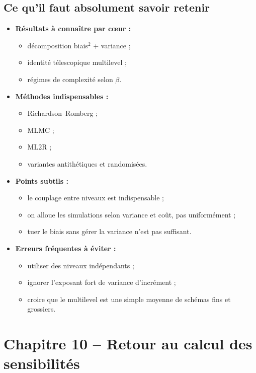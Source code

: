 \documentclass[11pt,a4paper]{article}
\begin{document}
\subsection{Ce qu'il faut absolument savoir retenir}

\begin{itemize}
  \item \textbf{Résultats à connaître par cœur :}
  \begin{itemize}
    \item décomposition biais$^2$ + variance ;
    \item identité télescopique multilevel ;
    \item régimes de complexité selon $\beta$.
  \end{itemize}
  \item \textbf{Méthodes indispensables :}
  \begin{itemize}
    \item Richardson--Romberg ;
    \item MLMC ;
    \item ML2R ;
    \item variantes antithétiques et randomisées.
  \end{itemize}
  \item \textbf{Points subtils :}
  \begin{itemize}
    \item le couplage entre niveaux est indispensable ;
    \item on alloue les simulations selon variance et coût, pas uniformément ;
    \item tuer le biais sans gérer la variance n'est pas suffisant.
  \end{itemize}
  \item \textbf{Erreurs fréquentes à éviter :}
  \begin{itemize}
    \item utiliser des niveaux indépendants ;
    \item ignorer l'exposant fort de variance d'incrément ;
    \item croire que le multilevel est une simple moyenne de schémas fins et grossiers.
  \end{itemize}
\end{itemize}

\section{Chapitre 10 -- Retour au calcul des sensibilités}
\end{document}
